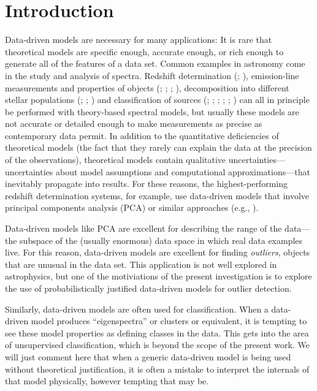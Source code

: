 \documentclass[12pt,preprint]{aastex}
\begin{document}
\section{Introduction}\label{sec:introduction}
Data-driven models are necessary for many applications: It is rare
that theoretical models are specific enough, accurate enough, or rich
enough to generate all of the features of a data set.  Common examples 
in astronomy come in the study and analysis of spectra.  Redshift
determination (\citealt{budavari}; \citealt{glazebrook}),
emission-line measurements and properties of objects (\citealt{allen}; 
\citealt{borosona}; \citealt{borosonc}; \citealt{wild}), 
decomposition into different stellar populations (\citealt{chen}; 
\citealt{ferreras}; \citealt{nolan}) and
classification of sources (\citealt{borosona}; \citealt{connolly};
\citealt{francis}; \citealt{suzuki}; \citealt{yip}; \citealt{yipb}) can all in
principle be performed with theory-based spectral models, but usually these 
models are not accurate or detailed enough to make
measurements as precise as contemporary data permit.  In addition to
the quantitative deficiencies of theoretical models (the fact that
they rarely can explain the data at the precision of the
observations), theoretical models contain qualitative
uncertainties---uncertainties about model assumptions and
computational approximations---that inevitably propagate into results.
For these reasons, the highest-performing redshift determination
systems, for example, use data-driven models that involve principal
components analysis (PCA) or similar approaches (e.g., \citealt{sdssdr7}).

Data-driven models like PCA are excellent for describing the range of
the data---the subspace of the (usually enormous) data space in which
real data examples live.  For this reason, data-driven models are
excellent for finding \emph{outliers}, objects that are unusual in the
data set.  This application is not well explored in astrophysics,
but one of the motiviations of the present investigation is to explore
the use of probabilistically justified data-driven models for outlier
detection.

Similarly, data-driven models are often used for classification.  When
a data-driven model produces ``eigenspectra'' or clusters or
equivalent, it is tempting to see these model properties as defining
classes in the data.  This gets into the area of unsupervised
classification, which is beyond the scope of the present work.
We will just comment here that when a
generic data-driven model is being used without theoretical
justification, it is often a mistake to interpret the internals of
that model physically, however tempting that may be.
\end{document}
